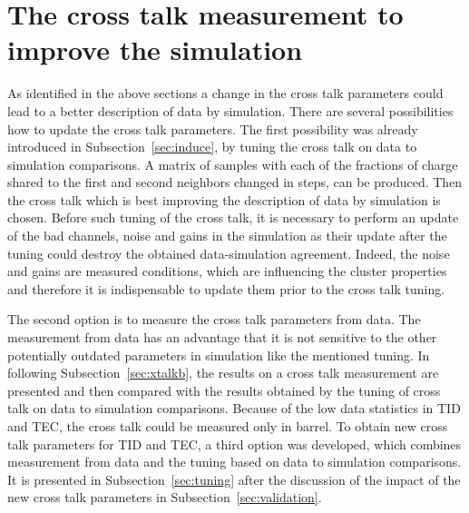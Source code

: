 

\section{The cross talk measurement to improve the simulation~\label{sec:xtalk}}

As identified in the above sections a change in the cross talk parameters could lead to a better description of data by simulation. There are several possibilities how to update the cross talk parameters. The first possibility was already introduced in Subsection~\ref{sec:induce}, by tuning the cross talk on data to simulation comparisons. A matrix of samples with each of the fractions of charge shared to the first and second neighbors changed in steps, can be produced. Then the cross talk which is best improving the description of data by simulation is chosen. Before such tuning of the cross talk, it is necessary to perform an update of the bad channels, noise and gains in the simulation as their update after the tuning could destroy the obtained data-simulation agreement. Indeed, the noise and gains are measured conditions, which are influencing the cluster properties and therefore it is indispensable to update them prior to the cross talk tuning.


The second option is to measure the cross talk parameters from data. The measurement from data has an advantage that it is not sensitive to the other potentially outdated parameters in simulation like the mentioned tuning. In following Subsection~\ref{sec:xtalkb}, the results on a cross talk measurement are presented and then compared with the results obtained by the tuning of cross talk on data to simulation comparisons. Because of the low data statistics in TID and TEC, the cross talk could be measured only in barrel. To obtain new cross talk parameters for TID and TEC, a third option was developed, which combines measurement from data and the tuning based on data to simulation comparisons. It is presented in Subsection~\ref{sec:tuning} after the discussion of the impact of the new cross talk parameters in Subsection~\ref{sec:validation}.


